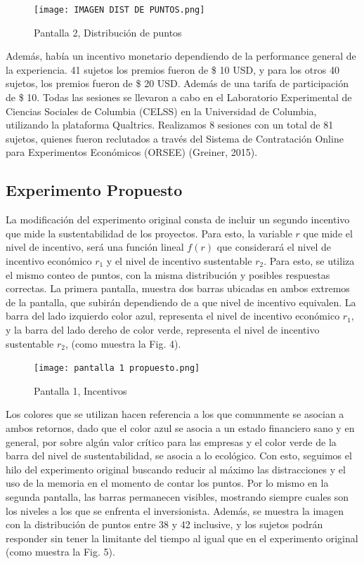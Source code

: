 \documentclass[11pt,letterpaper]{article}
\begin{document}
    \begin{figure}[h]
        \centering
        \texttt{[image: IMAGEN DIST DE PUNTOS.png]}
        \caption{Pantalla 2, Distribución de puntos}
    \end{figure}


Además, había un incentivo monetario dependiendo de la performance general de la experiencia. 41 sujetos los premios fueron de \$ 10 USD, y para los otros 40 sujetos, los premios fueron de \$ 20 USD. Además de una tarifa de participación de \$ 10.
Todas las sesiones se llevaron a cabo en el Laboratorio Experimental de Ciencias Sociales de Columbia (CELSS) en la Universidad de Columbia, utilizando la plataforma Qualtrics. Realizamos 8 sesiones con un total de 81 sujetos, quienes fueron reclutados a través del Sistema de Contratación Online para Experimentos Económicos (ORSEE) (Greiner, 2015).

\subsection{Experimento Propuesto}

La modificación del experimento original consta de incluir un segundo incentivo que mide la sustentabilidad de los proyectos. Para esto, la variable $r$ que mide el nivel de incentivo, será una función lineal $f(r)$ que considerará el nivel de incentivo económico $r_1$ y el nivel de incentivo sustentable $r_2$.
Para esto, se utiliza el mismo conteo de puntos, con la misma distribución y posibles respuestas correctas. La primera pantalla, muestra dos barras ubicadas en ambos extremos de la pantalla, que subirán dependiendo de a que nivel de incentivo equivalen. La barra del lado izquierdo color azul, representa el nivel de incentivo económico $r_1$, y la barra del lado dereho de color verde, representa el nivel de incentivo sustentable $r_2$, (como muestra la Fig. 4). 

\begin{figure}[h]
        \centering
        \texttt{[image: pantalla 1 propuesto.png]}
        \caption{Pantalla 1, Incentivos}
    \end{figure}

Los colores que se utilizan hacen referencia a los que comunmente se asocian a ambos retornos, dado que el color azul se asocia a un estado financiero sano y en general, por sobre algún valor crítico para las empresas y el color verde de la barra del nivel de sustentabilidad, se asocia a lo ecológico. Con esto, seguimos el hilo del experimento original buscando reducir al máximo las distracciones y el uso de la memoria en el momento de contar los puntos. 
Por lo mismo en la segunda pantalla, las barras permanecen visibles, mostrando siempre cuales son los niveles a los que se enfrenta el inversionista. Además, se muestra la imagen con la distribución de puntos entre 38 y 42 inclusive, y los sujetos podrán responder sin tener la limitante del tiempo al igual que en el experimento original (como muestra la Fig. 5).
\end{document}
